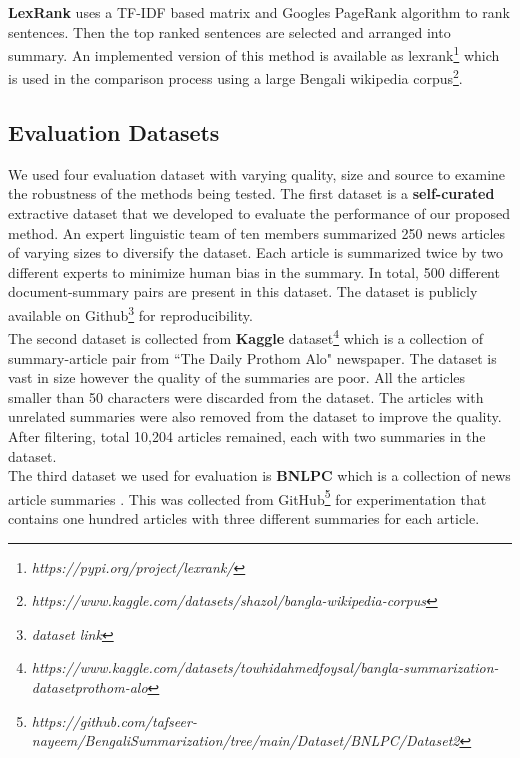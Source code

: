 \textbf{LexRank} \cite{Erkan-lexRank-2004} uses a TF-IDF based matrix and Googles PageRank algorithm \cite{page-PageRank-1999} to rank sentences. Then the top ranked sentences are selected and arranged into summary. An implemented version of this method is available as lexrank\footnote{\textit{https://pypi.org/project/lexrank/}} which is used in the comparison process using a large Bengali wikipedia corpus\footnote{\textit{https://www.kaggle.com/datasets/shazol/bangla-wikipedia-corpus}}.

\subsection{Evaluation Datasets}\label{subsec:evaluation-datasets}
We used four evaluation dataset with varying quality, size and source to examine the robustness of the methods being tested. The first dataset is a \textbf{self-curated} extractive dataset that we developed to evaluate the performance of our proposed method. An expert linguistic team of ten members summarized 250 news articles of varying sizes to diversify the dataset. Each article is summarized twice by two different experts to minimize human bias in the summary. In total, 500 different document-summary pairs are present in this dataset. The dataset is publicly available on Github\footnote{\textit{dataset link}} for reproducibility.\\

The second dataset is collected from \textbf{Kaggle} dataset\footnote{\textit{https://www.kaggle.com/datasets/towhidahmedfoysal/bangla-summarization-datasetprothom-alo}} which is a collection of summary-article pair from ``The Daily Prothom Alo" newspaper. The dataset is vast in size however the quality of the summaries are poor. All the articles smaller than 50 characters were discarded from the dataset. The articles with unrelated summaries were also removed from the dataset to improve the quality. After filtering, total 10,204 articles remained, each with two summaries in the dataset.\\

The third dataset we used for evaluation is \textbf{BNLPC} which is a collection of news article summaries \cite{Hque-2015-BNLPC-Dataset}. This was collected from GitHub\footnote{\textit{https://github.com/tafseer-nayeem/BengaliSummarization/tree/main/Dataset/BNLPC/Dataset2}} for experimentation that contains one hundred articles with three different summaries for each article.\\

